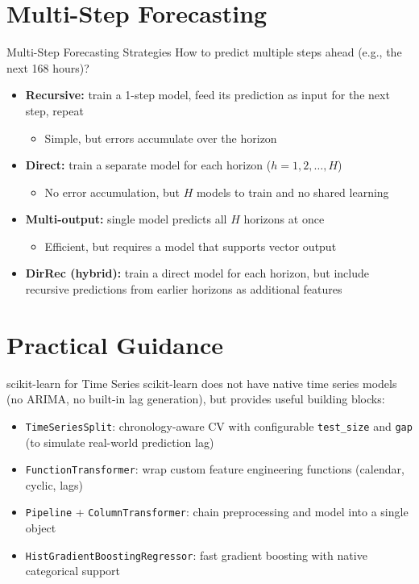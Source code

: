 \documentclass[11pt,compress,t,notes=noshow, xcolor=table]{beamer}
\begin{document}
\section{Multi-Step Forecasting}
\begin{vbframe}{Multi-Step Forecasting Strategies}
\vfill
How to predict multiple steps ahead (e.g., the next 168 hours)?
\vfill
\begin{itemize}
    \item \textbf{Recursive:} train a 1-step model, feed its prediction as input for the next step, repeat
    \begin{itemize}
        \item Simple, but errors accumulate over the horizon
    \end{itemize}
    \item \textbf{Direct:} train a separate model for each horizon ($h=1, 2, \ldots, H$)
    \begin{itemize}
        \item No error accumulation, but $H$ models to train and no shared learning
    \end{itemize}
    \item \textbf{Multi-output:} single model predicts all $H$ horizons at once
    \begin{itemize}
        \item Efficient, but requires a model that supports vector output
    \end{itemize}
    \item \textbf{DirRec (hybrid):} train a direct model for each horizon, but include recursive predictions from earlier horizons as additional features
\end{itemize}
\vfill
\end{vbframe}


\section{Practical Guidance}
\begin{vbframe}{scikit-learn for Time Series}
\vfill
scikit-learn does not have native time series models (no ARIMA, no built-in lag generation), but provides useful building blocks:
\vfill
\begin{itemize}
    \item \texttt{TimeSeriesSplit}: chronology-aware CV with configurable \texttt{test\_size} and \texttt{gap} (to simulate real-world prediction lag)
    \item \texttt{FunctionTransformer}: wrap custom feature engineering functions (calendar, cyclic, lags)
    \item \texttt{Pipeline} + \texttt{ColumnTransformer}: chain preprocessing and model into a single object
    \item \texttt{HistGradientBoostingRegressor}: fast gradient boosting with native categorical support
\end{itemize}
\vfill
\end{vbframe}
\end{document}
